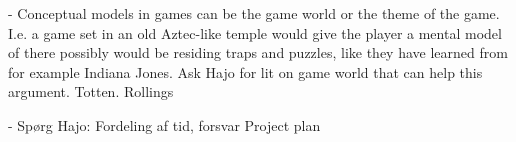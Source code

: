 - Conceptual models in games can be the game world or the theme of the game. I.e. a game set in an old Aztec-like temple would give the player a mental model of there possibly would be residing traps and puzzles, like they have learned from for example Indiana Jones. Ask Hajo for lit on game world that can
help this argument. Totten. Rollings

- Spørg Hajo: Fordeling af tid, forsvar
Project plan
